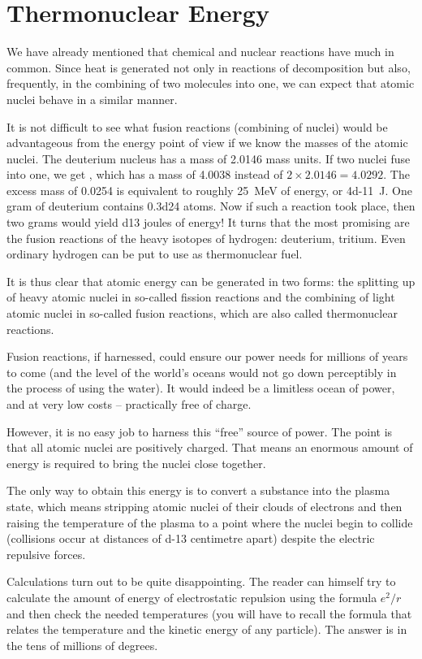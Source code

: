 \section{Thermonuclear Energy}
We have already mentioned that chemical and nuclear reactions have much in common. Since heat is generated not only in reactions of decomposition but also, frequent­ly, in the combining of two molecules into one, we can expect that atomic nuclei behave in a similar manner.

It is not difficult to see what fusion reactions (com­bining of nuclei) would be advantageous from the energy point of view if we know the masses of the atomic nuclei.
The deuterium nucleus has a mass of 2.0146 mass units. If two nuclei fuse into one, we get , which has a mass of 4.0038 instead of $2 \times 2.0146 = 4.0292$. The excess mass of 0.0254 is equivalent to roughly \SI{25}{\mega\electronvolt} of energy, or \SI{4d-11}{\joule}. One gram of deuterium contains \num{0.3d24} atoms. Now if such a reaction took place, then two grams would yield \num{d13} joules of energy! It turns that the most promising are the fusion reactions of the heavy isotopes of hydrogen: deuterium, tritium. Even ordinary hydrogen can be put to use as thermonuclear fuel.

It is thus clear that atomic energy can be generated in two forms: the splitting up of heavy atomic nuclei in so-called fission reactions and the combining of light atomic nuclei in so-called fusion reactions, which are also called thermonuclear reactions.

Fusion reactions, if harnessed, could ensure our power needs for millions of years to come (and the level of the world's oceans would not go down perceptibly in the process of using the water). It would indeed be a limitless ocean of power, and at very low costs -- practically free of charge.

However, it is no easy job to harness this ``free'' source of power. The point is that all atomic nuclei are posi­tively charged. That means an enormous amount of energy is required to bring the nuclei close together.

The only way to obtain this energy is to convert a substance into the plasma state, which means stripping atomic nuclei of their clouds of electrons and then rais­ing the temperature of the plasma to a point where the nuclei begin to collide (collisions occur at distances of \num{d-13} centimetre apart) despite the electric repulsive forces.

Calculations turn out to be quite disappointing. The reader can himself try to calculate the amount of energy of electrostatic repulsion using the formula $e^{2}/r$ and then check the needed temperatures (you will have to recall the formula that relates the temperature and the kinetic energy of any particle). The answer is in the tens of millions of degrees.

